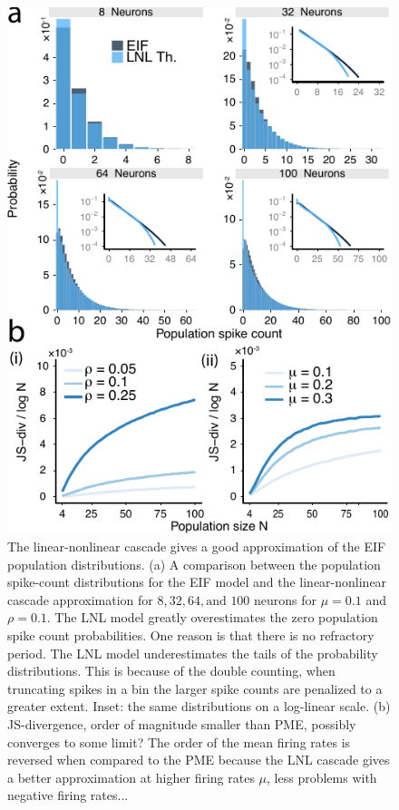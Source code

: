 \documentclass[%
 reprint,
 twocolumn,
 amsmath,amssymb,
 aps,
floatfix,
]{revtex4}
\begin{document}
\begin{figure}[h]
\includegraphics{../../R/fig_3/fig_3a_test.pdf}
\caption{\label{fig:eiffilter} The linear-nonlinear cascade gives a good approximation of the EIF population distributions. (a) A comparison between the population spike-count distributions for the EIF model and the linear-nonlinear cascade approximation for $8, 32, 64, \text{and } 100$ neurons for $\mu = 0.1$ and $\rho = 0.1$. The LNL model greatly overestimates the zero population spike count probabilities. One reason is that there is no refractory period. The LNL model underestimates the tails of the probability distributions. This is because of the double counting, when truncating spikes in a bin the larger spike counts are penalized to a greater extent. Inset: the same distributions on a log-linear scale. (b) JS-divergence, order of magnitude smaller than PME, possibly converges to some limit? The order of the mean firing rates is reversed when compared to the PME because the LNL cascade gives a better approximation at higher firing rates $\mu$, less problems with negative firing rates...}
\end{figure}
\end{document}

